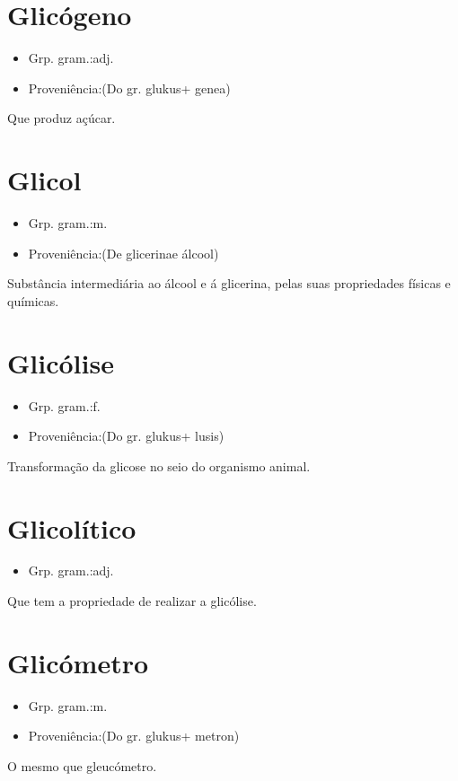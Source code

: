 \section{Glicógeno}
\begin{itemize}
\item {Grp. gram.:adj.}
\end{itemize}
\begin{itemize}
\item {Proveniência:(Do gr. \textunderscore glukus\textunderscore  + \textunderscore genea\textunderscore )}
\end{itemize}
Que produz açúcar.
\section{Glicol}
\begin{itemize}
\item {Grp. gram.:m.}
\end{itemize}
\begin{itemize}
\item {Proveniência:(De \textunderscore glicerina\textunderscore  e \textunderscore álcool\textunderscore )}
\end{itemize}
Substância intermediária ao álcool e á glicerina, pelas suas propriedades físicas e químicas.
\section{Glicólise}
\begin{itemize}
\item {Grp. gram.:f.}
\end{itemize}
\begin{itemize}
\item {Proveniência:(Do gr. \textunderscore glukus\textunderscore  + \textunderscore lusis\textunderscore )}
\end{itemize}
Transformação da glicose no seio do organismo animal.
\section{Glicolítico}
\begin{itemize}
\item {Grp. gram.:adj.}
\end{itemize}
Que tem a propriedade de realizar a glicólise.
\section{Glicómetro}
\begin{itemize}
\item {Grp. gram.:m.}
\end{itemize}
\begin{itemize}
\item {Proveniência:(Do gr. \textunderscore glukus\textunderscore  + \textunderscore metron\textunderscore )}
\end{itemize}
O mesmo que \textunderscore gleucómetro\textunderscore .
